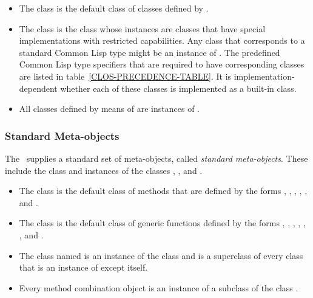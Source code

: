 \begin{itemize}

\item 
The class  is the default class of classes defined
by .

\item  The class  is the class whose
instances are classes that have special implementations with
restricted capabilities.  Any class that corresponds to a standard
Common Lisp type
might be an instance of .
The predefined Common Lisp type specifiers that are required to have
corresponding classes are listed in table~\ref{CLOS-PRECEDENCE-TABLE}.
It is implementation-dependent whether each of these classes is implemented as a built-in class.

\item 
All classes defined by means of  are instances of 
.
\end{itemize}


\subsubsection{Standard Meta-objects}

The \OS\ supplies a standard set of meta-objects, called \emph{standard
meta-objects}. These include the class  and
instances of the classes , 
, and .

\begin{itemize}

\item  
The class  is the default class of
methods that are defined by the forms , 
, , , 
, and .

\item 
The class  is the default class of 
generic functions defined by the forms ,
, , ,
, , and .

\item  The class named  is an instance of
the class  and is a superclass of every class that
is an instance of  except itself.

\item  Every method combination object is an instance of a
subclass of the class .

\end{itemize}


